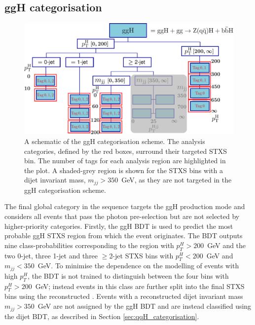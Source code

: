 \newpage
\subsection{ggH categorisation}\label{sec:ggh_categorisation}

\begin{figure}
  \centering
  \includegraphics[width=.8\textwidth]{Figures/hgg_overview/categorisation_schematics/ggHSchematic.pdf}
  \caption[ggH categorisation schematic]
  {
    A schematic of the ggH categorisation scheme. The analysis categories, defined by the red boxes, surround their targeted STXS bin. The number of tags for each analysis region are highlighted in the plot. A shaded-grey region is shown for the STXS bins with a dijet invariant mass, $m_{jj}>350$~GeV, as they are not targeted in the ggH categorisation scheme.
  }
  \label{fig:ggH_categorisation_schematic}
\end{figure}

The final global category in the sequence targets the ggH production mode and considers all events that pass the photon pre-selection but are not selected by higher-priority categories. Firstly, the ggH BDT is used to predict the most probable ggH STXS region from which the event originates. The BDT outputs nine class-probabilities corresponding to the region with $p_T^H>200$~GeV and the two 0-jet, three 1-jet and three $\geq$2-jet STXS bins with $p_T^H<200$~GeV and $m_{jj}<350$~GeV. To minimise the dependence on the modelling of events with high $p_T^H$, the BDT is not trained to distinguish between the four bins with $p_T^H>200$~GeV; instead events in this class are further split into the final STXS bins using the reconstructed \ptgg. Events with a reconstructed dijet invariant mass $m_{jj}>350$~GeV are not assigned by the ggH BDT and are instead classified using the dijet BDT, as described in Section \ref{sec:qqH_categorisation}.

